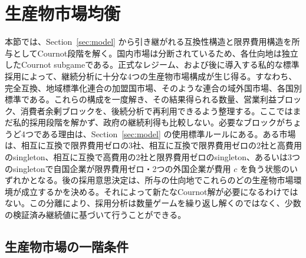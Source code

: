 \section{生産物市場均衡}
\label{sec:product-market}

本節では、Section~\ref{sec:model} から引き継がれる互換性構造と限界費用構造を所与としてCournot段階を解く。国内市場は分断されているため、各仕向地は独立したCournot subgameである。正式なレジーム、および後に導入する私的な標準採用によって、継続分析に十分な4つの生産物市場構成が生じ得る。すなわち、完全互換、地域標準化連合の加盟国市場、そのような連合の域外国市場、各国別標準である。これらの構成を一度解き、その結果得られる数量、営業利益ブロック、消費者余剰ブロックを、後続分析で再利用できるよう整理する。ここではまだ私的採用段階を解かず、政府の継続利得も比較しない。必要なブロックがちょうど4つである理由は、Section~\ref{sec:model} の使用標準ルールにある。ある市場は、相互に互換で限界費用ゼロの3社、相互に互換で限界費用ゼロの2社と高費用のsingleton、相互に互換で高費用の2社と限界費用ゼロのsingleton、あるいは3つのsingletonで自国企業が限界費用ゼロ・2つの外国企業が費用 $c$ を負う状態のいずれかとなる。後の採用意思決定は、所与の仕向地でこれらのどの生産物市場環境が成立するかを決める。それによって新たなCournot解が必要になるわけではない。この分離により、採用分析は数量ゲームを繰り返し解くのではなく、少数の検証済み継続値に基づいて行うことができる。

\subsection{生産物市場の一階条件}
\label{subsec:product-market-focs}

